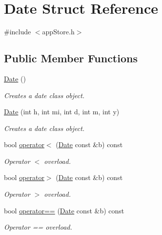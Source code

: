 \hypertarget{struct_date}{\section{Date Struct Reference}
\label{struct_date}
}


{\ttfamily \#include $<$app\-Store.\-h$>$}

\subsection*{Public Member Functions}
\begin{DoxyCompactItemize}
\item 
\hyperlink{struct_date_a4e59ed4ba66eec61c27460c5d09fa1bd}{Date} ()
\begin{DoxyCompactList}\small\item\em Creates a date class object. \end{DoxyCompactList}\item 
\hyperlink{struct_date_a6035b37cfccaf63b33f6c0e95b0099ea}{Date} (int h, int mi, int d, int m, int y)
\begin{DoxyCompactList}\small\item\em Creates a date class object. \end{DoxyCompactList}\item 
bool \hyperlink{struct_date_a6ec06696ab11aba7f7b0c3586a13a212}{operator$<$} (\hyperlink{struct_date}{Date} const \&b) const 
\begin{DoxyCompactList}\small\item\em Operator $<$ overload. \end{DoxyCompactList}\item 
bool \hyperlink{struct_date_ad3f9054d9708aa97b237ddf88495d70f}{operator$>$} (\hyperlink{struct_date}{Date} const \&b) const 
\begin{DoxyCompactList}\small\item\em Operator $>$ overload. \end{DoxyCompactList}\item 
bool \hyperlink{struct_date_af7d714167e08de849d2d04b2246cfcfa}{operator==} (\hyperlink{struct_date}{Date} const \&b) const 
\begin{DoxyCompactList}\small\item\em Operator == overload. \end{DoxyCompactList}\end{DoxyCompactItemize}
